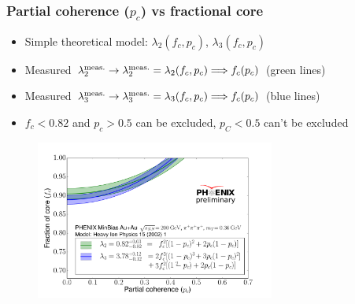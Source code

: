 \documentclass{beamer}
\begin{document}
\begin{frame}
\frametitle{Partial coherence ($p_c$) vs fractional core}
\begin{itemize}
\vspace{-0.004\textheight}
\item Simple theoretical model: $\lambda_2(f_c, p_c)$, $\lambda_3(f_c, p_c)$ 
\item Measured $\lambda_2^{\rm meas.} \rightarrow \lambda_2^{\rm meas.}=\lambda_2(f_c,p_c) \Longrightarrow f_c(p_c)$ (green lines)
\item Measured $\lambda_3^{\rm meas.} \rightarrow \lambda_3^{\rm meas.}=\lambda_3(f_c,p_c) \Longrightarrow f_c(p_c)$ (blue lines)
\item $f_c<0.82$ and $p_c>0.5$ can be excluded, $p_C<0.5$ can't be excluded
\end{itemize}

\begin{figure}
\includegraphics[width=0.7\textwidth]{pic/cropped_fcpc2}
\end{figure}
\end{frame}
\end{document}
